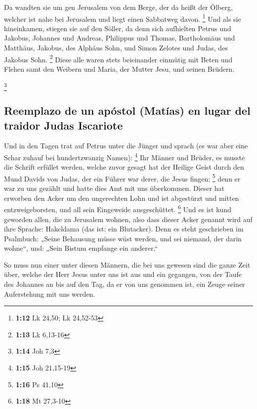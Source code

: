 Da wandten sie um gen Jerusalem von dem Berge, der da
heißt der Ölberg, welcher ist nahe bei Jerusalem und liegt einen
Sabbatweg davon. \footnote{\textbf{1:12} Lk 24,50; Lk 24,52-53}
 Und als sie hineinkamen, stiegen sie auf den Söller, da
denn sich aufhielten Petrus und Jakobus, Johannes und Andreas, Philippus
und Thomas, Bartholomäus und Matthäus, Jakobus, des Alphäus Sohn, und
Simon Zelotes und Judas, des Jakobus Sohn. \footnote{\textbf{1:13} Lk
  6,13-16}  Diese alle waren stets beieinander einmütig
mit Beten und Flehen samt den Weibern und Maria, der Mutter Jesu, und
seinen Brüdern.

\footnote{\textbf{1:14} Joh 7,3}

\hypertarget{reemplazo-de-un-apuxf3stol-matuxedas-en-lugar-del-traidor-judas-iscariote}{%
\subsection{Reemplazo de un apóstol (Matías) en lugar del traidor Judas
Iscariote}\label{reemplazo-de-un-apuxf3stol-matuxedas-en-lugar-del-traidor-judas-iscariote}}

 Und in den Tagen trat auf Petrus unter die Jünger und
sprach (es war aber eine Schar zuhauf bei hundertzwanzig Namen):
\footnote{\textbf{1:15} Joh 21,15-19}  Ihr Männer und
Brüder, es musste die Schrift erfüllet werden, welche zuvor gesagt hat
der Heilige Geist durch den Mund Davids von Judas, der ein Führer war
derer, die Jesus fingen; \footnote{\textbf{1:16} Ps 41,10}
 denn er war zu uns gezählt und hatte dies Amt mit uns
überkommen.  Dieser hat erworben den Acker um den
ungerechten Lohn und ist abgestürzt und mitten entzweigeborsten, und all
sein Eingeweide ausgeschüttet. \footnote{\textbf{1:18} Mt 27,3-10}
 Und es ist kund geworden allen, die zu Jerusalem wohnen,
also dass dieser Acker genannt wird auf ihre Sprache: Hakeldama (das
ist: ein Blutacker).  Denn es steht geschrieben im
Psalmbuch: „Seine Behausung müsse wüst werden, und sei niemand, der
darin wohne``, und: „Sein Bistum empfange ein anderer.``

 So muss nun einer unter diesen Männern, die bei uns
gewesen sind die ganze Zeit über, welche der Herr Jesus unter uns ist
aus und ein gegangen,  von der Taufe des Johannes an bis
auf den Tag, da er von uns genommen ist, ein Zeuge seiner Auferstehung
mit uns werden.

